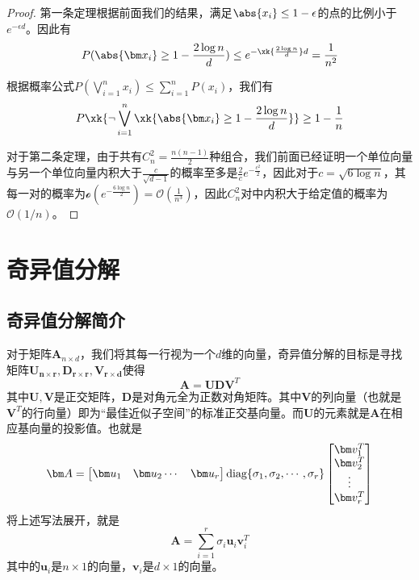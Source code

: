 \documentclass[UTF8]{ctexbook}
\newcommand{\diag}{\textup{diag}}
\begin{document}
\begin{proof}
第一条定理根据前面我们的结果，满足$\abs{x_i} \le 1-\epsilon$的点的比例小于$e^{-\epsilon d}$。因此有
\begin{equation}
P(\abs{\bm x_i} \ge 1-\frac{2\log n}{d}) \le e^{-\xk{\frac{2\log n}{d}} d} = \frac{1}{n^2}
\end{equation}

根据概率公式$P(\bigvee_{i=1}^{n}x_i) \le \sum_{i=1}^{n} P(x_i)$，我们有
\begin{equation}
P\xk{\neg \bigvee_{i=1}^{n}\xk{\abs{\bm x_i} \ge 1-\frac{2\log n}{d}} } \ge 1-\frac{1}{n}
\end{equation}

对于第二条定理，由于共有$C_n^2 = \frac{n(n-1)}{2}$种组合，我们前面已经证明一个单位向量与另一个单位向量内积大于$\frac{c}{\sqrt{d-1}}$的概率至多是$\frac{2}{c}e^{-\frac{c^2}{2}}$，因此对于$c = \sqrt{6\log n}$，其每一对的概率为$\mathcal{o}(e^{-\frac{6\log n}{2}}) = \mathcal{O}(\frac{1}{n^3})$，因此$C_n^2$对中内积大于给定值的概率为$\mathcal{O}(1/n)$。
\end{proof}




\chapter{奇异值分解}

\section{奇异值分解简介}
对于矩阵$\bm A_{n\times d}$，我们将其每一行视为一个$d$维的向量，奇异值分解的目标是寻找矩阵$\bm{U_{n\times r}, D_{r\times r}, V_{r\times d}}$使得
\begin{equation}
	\bm A = \bm{UDV}^{T}	
\end{equation}
其中$\bm U, \bm V$是正交矩阵，$\bm D$是对角元全为正数对角矩阵。其中$\bm V$的列向量（也就是$\bm V^{T}$的行向量）即为“最佳近似子空间”的标准正交基向量。而$\bm U$的元素就是$\bm A$在相应基向量的投影值。也就是
\begin{equation}
	\bm A = \begin{bmatrix}	\bm u_1 & \bm u_2 \cdots & \bm u_r\end{bmatrix} \diag \{\sigma_1, \sigma_2, \cdots, \sigma_r\}\begin{bmatrix}	\bm v_1^T \\ \bm v_2^T \\ \vdots \\ \bm v_r^T\end{bmatrix}
	\label{eq:svd1}
\end{equation}
将上述写法展开，就是
\begin{equation}
	\bm A = \sum_{i=1}^r \sigma_i \bm u_i \bm v_i^T
\end{equation}
其中的$\bm u_i$是$n\times 1$的向量，$\bm v_i$是$d\times 1$的向量。
\end{document}
